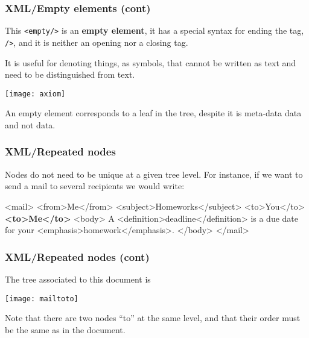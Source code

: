%
\begin{frame}[containsverbatim]
\frametitle{XML/Empty elements (cont)}

This \verb|<empty/>| is an \textbf{empty element}, it has a special
syntax for ending the tag, \verb|/>|, and it is neither an opening nor
a closing tag.

\bigskip

It is useful for denoting things, as symbols, that cannot be written
as text and need to be distinguished from text.
\begin{center}
\texttt{[image: axiom]}
\end{center}
An empty element corresponds to a leaf in the \XML tree, despite it is
meta-data data and not data.

\end{frame}

%
\begin{frame}[containsverbatim]
\frametitle{XML/Repeated nodes}

Nodes do not need to be unique at a given tree level. For instance, if
we want to send a mail to several recipients we would write:
{\small
\begin{semiverbatim}
<mail>
  <from>Me</from>
  <subject>Homeworks</subject>
  <to>You</to>
  \textbf{<to>Me</to>} 
  <body>
  A <definition>deadline</definition> is a due date for your
<emphasis>homework</emphasis>.
  </body>
</mail>
\end{semiverbatim}
}

\end{frame}

%
\begin{frame}
\frametitle{XML/Repeated nodes (cont)}

The \XML tree associated to this \XML document is
\begin{center}
\texttt{[image: mailtoto]}
\end{center}
Note that there are two nodes ``to'' at the same level, and that their
order must be the same as in the \XML document.

\end{frame}

